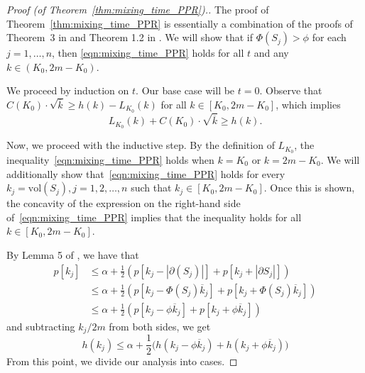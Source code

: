 \documentclass[11pt,twoside]{article}
\theoremstyle{definition}
\newcommand{\vol}{\mathrm{vol}}
\newcommand{\abs}[1]{\left \lvert #1 \right \rvert}
\newcommand{\1}{\mathbbm{1}}
\begin{document}
\begin{proof}[Proof (of Theorem~\ref{thm:mixing_time_PPR}).]
	The proof of Theorem~\ref{thm:mixing_time_PPR} is essentially a combination of the proofs of Theorem~3 in \citet{andersen2006} and Theorem 1.2 in \citet{lovasz1990}. We will show that if $\Phi(S_j) > \phi$ for each $j = 1,\ldots,n$, then \eqref{eqn:mixing_time_PPR} holds for all $t$ and any $k \in (K_0,2m - K_0)$.
	
	We proceed by induction on $t$. Our base case will be $t = 0$. Observe that $C(K_0) \cdot \sqrt{\overline{k}} \geq  h(k) - L_{K_0}(k)$ for all $k \in [K_0,2m - K_0]$, which implies
	\begin{equation*}
	L_{K_0}(k) + C(K_0) \cdot \sqrt{\overline{k}} \geq h(k).
	\end{equation*}
	
	Now, we proceed with the inductive step. By the definition of $L_{K_0}$, the inequality~\eqref{eqn:mixing_time_PPR} holds when $k = K_0$ or $k = 2m - K_0$. We will additionally show that~\eqref{eqn:mixing_time_PPR} holds for every $k_j = \vol(S_j), j = 1,2,\ldots,n$ such that $k_j \in [K_0, 2m - K_0]$. Once this is shown, the concavity of the expression on the right-hand side of~\eqref{eqn:mixing_time_PPR} implies that the inequality holds for all $k \in [K_0,2m - K_0]$.
	
	By Lemma 5 of \citet{andersen2006}, we have that
	\begin{align}
	p[k_j] & \leq \alpha + \frac{1}{2}  \left(p[k_j - \abs{\partial(S_j)}] + p[k_j + \abs{\partial{S_j}}]  \right) \nonumber\\
	& \leq \alpha + \frac{1}{2} \left(p[k_j - \Phi(S_j) \overline{k}_j] + p[k_j + \Phi(S_j) \overline{k}_j]  \right) \nonumber \\
	& \leq \alpha + \frac{1}{2} \left(p[k_j - \phi \overline{k}_j] + p[k_j + \phi \overline{k}_j]\right) \nonumber
	\end{align}
	and subtracting $k_j/2m$ from both sides, we get
	\begin{equation}
	\label{eqn:mixing_time_PPR_pf1}
	h(k_j) \leq \alpha + \frac{1}{2} \bigl(h(k_j - \phi \overline{k}_j) + h(k_j +  \phi \overline{k}_j) \bigr)
	\end{equation}
	From this point, we divide our analysis into cases. 
	

\end{proof}
\end{document}

